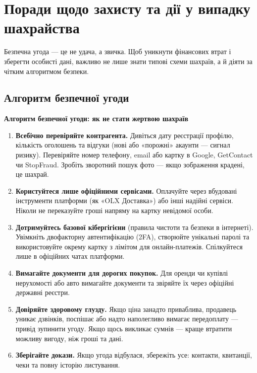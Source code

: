 \newpage

\chapter{Поради щодо захисту та дії у випадку шахрайства}

Безпечна угода — це не удача, а звичка. Щоб уникнути фінансових втрат і зберегти особисті дані, важливо не лише знати типові схеми шахраїв, а й діяти за чітким алгоритмом безпеки.

\section{Алгоритм безпечної угоди}

\vspace{0.3cm}
\noindent\textbf{Алгоритм безпечної угоди: як не стати жертвою шахраїв}

\begin{enumerate}
    \item \textbf{Всебічно перевіряйте контрагента.} Дивіться дату реєстрації профілю, кількість оголошень та відгуки (нові або «порожні» акаунти — сигнал ризику). Перевіряйте номер телефону, email або картку в Google, GetContact чи StopFraud. Зробіть зворотний пошук фото — якщо зображення крадені, це шахрай.
    
    \item \textbf{Користуйтеся лише офіційними сервісами.} Оплачуйте через вбудовані інструменти платформи (як «OLX Доставка») або інші надійні сервіси. Ніколи не переказуйте гроші напряму на картку невідомої особи.
    
    \item \textbf{Дотримуйтесь базової кібергігієни} (правила чистоти та безпеки в інтернеті). Увімкніть двофакторну автентифікацію (2FA), створюйте унікальні паролі та використовуйте окрему картку з лімітом для онлайн-платежів. Спілкуйтеся лише в офіційних чатах платформи.
    
\newpage

    \item \textbf{Вимагайте документи для дорогих покупок.} Для оренди чи купівлі нерухомості або авто вимагайте документи та звіряйте їх через офіційні державні реєстри.
    
    \item \textbf{Довіряйте здоровому глузду.} Якщо ціна занадто приваблива, продавець уникає дзвінків, поспішає або надто наполегливо вимагає передоплату — привід зупинити угоду. Якщо щось викликає сумнів — краще втратити можливу вигоду, ніж гроші та дані.
    
    \item \textbf{Зберігайте докази.} Якщо угода відбулася, збережіть усе: контакти, квитанції, чеки та повну історію листування.
\end{enumerate}

